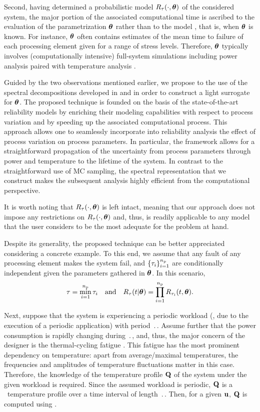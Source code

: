 Second, having determined a probabilistic model $R_\tau(\cdot, \bm{\theta})$ of the considered system, the major portion of the associated computational time is ascribed to the evaluation of the parametrization $\bm{\theta}$ rather than to the model \perse, that is, when $\bm{\theta}$ is known.
For instance, $\bm{\theta}$ often contains estimates of the mean time to failure of each processing element given for a range of stress levels.
Therefore, $\bm{\theta}$ typically involves (computationally intensive) full-system simulations including power analysis paired with temperature analysis \cite{xiang2010}.

Guided by the two observations mentioned earlier, we propose to the use of the spectral decompositions developed in  and  in order to construct a light surrogate for $\bm{\theta}$.
The proposed technique is founded on the basis of the state-of-the-art reliability models by enriching their modeling capabilities with respect to process variation and by speeding up the associated computational process.
This approach allows one to seamlessly incorporate into reliability analysis the effect of process variation on process parameters.
In particular, the framework allows for a straightforward propagation of the uncertainty from process parameters through power and temperature to the lifetime of the system.
In contrast to the straightforward use of MC sampling, the spectral representation that we construct makes the subsequent analysis highly efficient from the computational perspective.

It is worth noting that $R_\tau(\cdot, \bm{\theta})$ is left intact, meaning that our approach does not impose any restrictions on $R_\tau(\cdot, \bm{\theta})$ and, thus, is readily applicable to any model that the user considers to be the most adequate for the problem at hand.

Despite its generality, the proposed technique can be better appreciated considering a concrete example.
To this end, we assume that any fault of any processing element makes the system fail, and $\{ \tau_i \}_{i = 1}^{n_\text{p}}$ are conditionally independent given the parameters gathered in $\bm{\theta}$.
In this scenario,
\[
  \tau = \min_{i = 1}^{n_\text{p}} \tau_i \hspace{1em} \text{and} \hspace{1em} R_\tau(t | \bm{\theta}) = \prod_{i = 1}^{n_\text{p}} R_{\tau_i}(t, \bm{\theta}).
\]

Next, suppose that the system is experiencing a periodic workload (\eg, due to the execution of a periodic application) with period $\period$.
Assume further that the power consumption is rapidly changing during $\period$, and, thus, the major concern of the designer is the thermal-cycling fatigue \cite{jedec2011}.
This fatigue has the most prominent dependency on temperature: apart from average/maximal temperatures, the frequencies and amplitudes of temperature fluctuations matter in this case.
Therefore, the knowledge of the temperature profile $\mathbf{Q}$ of the system under the given workload is required.
Since the assumed workload is periodic, $\mathbf{Q}$ is a \dss\ temperature profile over a time interval of length $\period$.
Then, for a given $\mathbf{u}$, $\mathbf{Q}$ is computed using .

